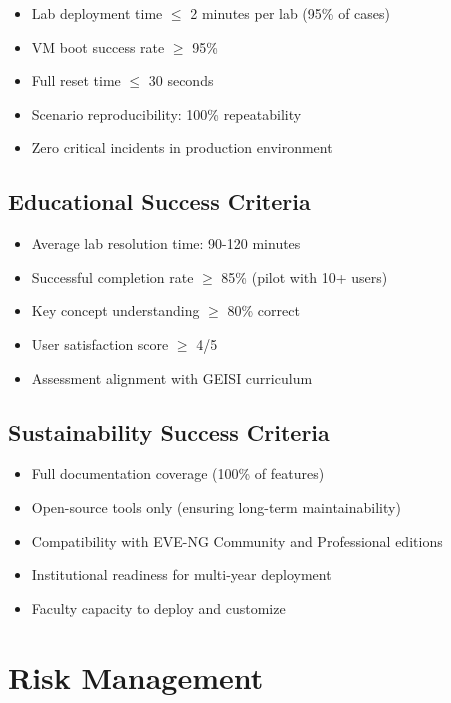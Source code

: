 \begin{itemize}

\item Lab deployment time $\leq$ 2 minutes per lab (95\% of cases)
\item VM boot success rate $\geq$ 95\%
\item Full reset time $\leq$ 30 seconds
\item Scenario reproducibility: 100\% repeatability
\item Zero critical incidents in production environment

\end{itemize}

\subsection{Educational Success Criteria}

\begin{itemize}

\item Average lab resolution time: 90-120 minutes
\item Successful completion rate $\geq$ 85\% (pilot with 10+ users)
\item Key concept understanding $\geq$ 80\% correct
\item User satisfaction score $\geq$ 4/5
\item Assessment alignment with GEISI curriculum

\end{itemize}

\subsection{Sustainability Success Criteria}

\begin{itemize}

\item Full documentation coverage (100\% of features)
\item Open-source tools only (ensuring long-term maintainability)
\item Compatibility with EVE-NG Community and Professional editions
\item Institutional readiness for multi-year deployment
\item Faculty capacity to deploy and customize

\end{itemize}

\section{Risk Management}


